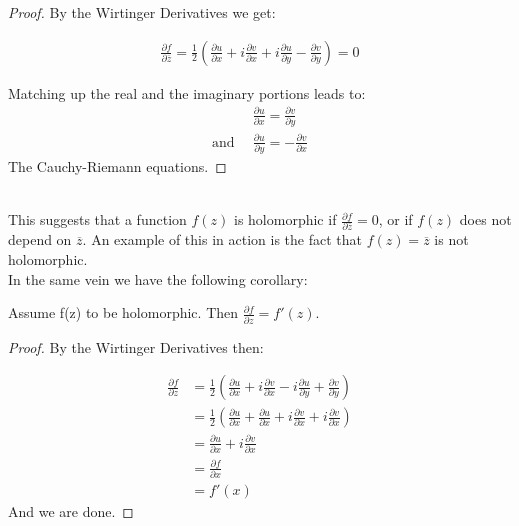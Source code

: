 \begin{proof} By the Wirtinger Derivatives we get:

\begin{align*}
\frac{\partial f}{\partial \overline{z}} = \frac{1}{2} \left( \frac{\partial u}{\partial x} + i\frac{\partial v}{\partial x} + i \frac{\partial u}{\partial y} - \frac{\partial v}{\partial y}\right) = 0
\end{align*}

Matching up the real and the imaginary portions leads to:
\begin{align*}
    &\frac{\partial u}{\partial x} = \frac{\partial v}{\partial y}\\
    \text{and } \, & \frac{\partial u}{\partial y} = -\frac{\partial v}{\partial x}
\end{align*}
The Cauchy-Riemann equations.
\end{proof}\\

This suggests that a function $f(z)$ is holomorphic if $\frac{\partial f}{\partial \overline{z}} = 0$, or if $f(z)$ does not depend on $\overline{z}$. An example of this in action is the fact that $f(z)=\overline{z}$ is not holomorphic.\\

In the same vein we have the following corollary:

\begin{corollary}
Assume f(z) to be holomorphic. Then $\frac{\partial f}{\partial z} = f'(z)$.
\end{corollary}

\begin{proof}
By the Wirtinger Derivatives then:

\begin{align*}
\frac{\partial f}{\partial z} &= \frac{1}{2}\left( \frac{\partial u}{\partial x} +i\frac{\partial v}{\partial x} -i\frac{\partial u}{\partial y}+\frac{\partial v}{\partial y}\right)\\
&=\frac{1}{2}\left( \frac{\partial u}{\partial x} + \frac{\partial u}{\partial x} + i\frac{\partial v}{\partial x} + i\frac{\partial v}{\partial x}\right)\\
&= \frac{\partial u}{\partial x} + i\frac{\partial v}{\partial x}\\
&= \frac{\partial f}{\partial x}\\
&= f'(x)
\end{align*}
And we are done.
\end{proof}\\

